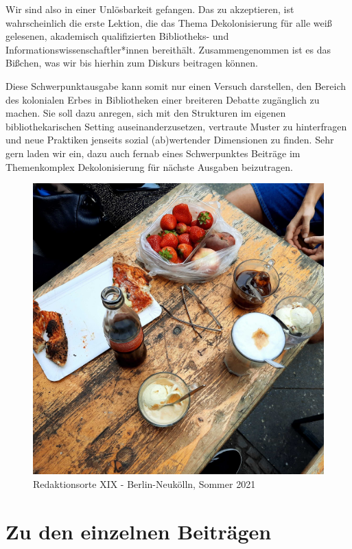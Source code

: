 \documentclass[a4paper,
fontsize=11pt,
oneside,
numbers=noperiodatend,
parskip=half-,
bibliography=totoc,
final
]{scrartcl}
\begin{document}
Wir sind also in einer Unlösbarkeit gefangen. Das zu akzeptieren, ist
wahrscheinlich die erste Lektion, die das Thema Dekolonisierung für alle
weiß gelesenen, akademisch qualifizierten Bibliotheks- und
Informationswissenschaftler*innen bereithält. Zusammengenommen ist es
das Bißchen, was wir bis hierhin zum Diskurs beitragen können.

Diese Schwerpunktausgabe kann somit nur einen Versuch darstellen, den
Bereich des kolonialen Erbes in Bibliotheken einer breiteren Debatte
zugänglich zu machen. Sie soll dazu anregen, sich mit den Strukturen im
eigenen bibliothekarischen Setting auseinanderzusetzen, vertraute Muster
zu hinterfragen und neue Praktiken jenseits sozial (ab)wertender
Dimensionen zu finden. Sehr gern laden wir ein, dazu auch fernab eines
Schwerpunktes Beiträge im Themenkomplex Dekolonisierung für nächste
Ausgaben beizutragen.

\begin{figure}
\centering
\includegraphics{img/img1.jpg}
\caption{Redaktionsorte XIX - Berlin-Neukölln, Sommer 2021}
\end{figure}

\hypertarget{zu-den-einzelnen-beitruxe4gen}{%
\section{Zu den einzelnen
Beiträgen}\label{zu-den-einzelnen-beitruxe4gen}}
\end{document}
